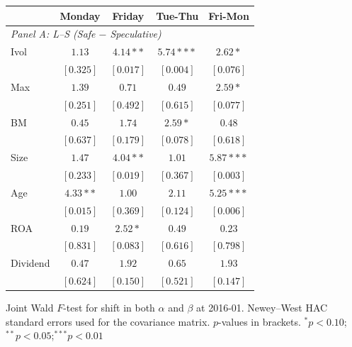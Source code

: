 \centering
\footnotesize
\begin{tabular}{l c c c c}
\toprule
 & Monday & Friday & Tue-Thu & Fri-Mon \\
\midrule
\multicolumn{5}{l}{\textit{Panel A: L--S (Safe $-$ Speculative)}} \\
Ivol & $1.13$ & $4.14**$ & $5.74***$ & $2.62*$ \\
 & $[0.325]$ & $[0.017]$ & $[0.004]$ & $[0.076]$ \\
Max & $1.39$ & $0.71$ & $0.49$ & $2.59*$ \\
 & $[0.251]$ & $[0.492]$ & $[0.615]$ & $[0.077]$ \\
BM & $0.45$ & $1.74$ & $2.59*$ & $0.48$ \\
 & $[0.637]$ & $[0.179]$ & $[0.078]$ & $[0.618]$ \\
Size & $1.47$ & $4.04**$ & $1.01$ & $5.87***$ \\
 & $[0.233]$ & $[0.019]$ & $[0.367]$ & $[0.003]$ \\
Age & $4.33**$ & $1.00$ & $2.11$ & $5.25***$ \\
 & $[0.015]$ & $[0.369]$ & $[0.124]$ & $[0.006]$ \\
ROA & $0.19$ & $2.52*$ & $0.49$ & $0.23$ \\
 & $[0.831]$ & $[0.083]$ & $[0.616]$ & $[0.798]$ \\
Dividend & $0.47$ & $1.92$ & $0.65$ & $1.93$ \\
 & $[0.624]$ & $[0.150]$ & $[0.521]$ & $[0.147]$ \\
\bottomrule
\end{tabular}
\vspace{4pt}
\begin{minipage}{0.9\textwidth}
\footnotesize
Joint Wald $F$-test for shift in both $\alpha$ and $\beta$ at 2016-01.
Newey--West HAC standard errors used for the covariance matrix.
$p$-values in brackets. $^{*}p<0.10$;\quad $^{**}p<0.05$;\quad $^{***}p<0.01$
\end{minipage}